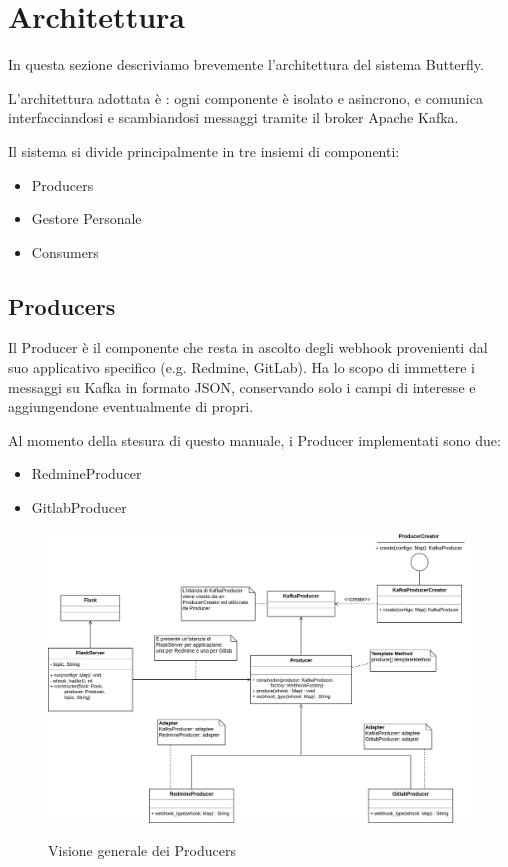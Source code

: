 \section{Architettura}

In questa sezione descriviamo brevemente l'architettura del sistema Butterfly.

L'architettura adottata è : ogni componente è isolato e asincrono,
e comunica interfacciandosi e scambiandosi messaggi tramite il broker Apache Kafka.

Il sistema si divide principalmente in tre insiemi di componenti:

\begin{itemize}
    \item Producers
    \item Gestore Personale
    \item Consumers
\end{itemize}

\subsection{Producers}
Il Producer è il componente che resta in ascolto degli webhook provenienti dal suo applicativo specifico (e.g. Redmine, GitLab).
Ha lo scopo di immettere i messaggi su Kafka in formato JSON, conservando solo i campi di interesse e aggiungendone eventualmente di propri.

Al momento della stesura di questo manuale, i Producer implementati sono due:
\begin{itemize}
    \item RedmineProducer
    \item GitlabProducer
\end{itemize}

\begin{figure}[H]
    \centering
    \includegraphics[width=\textwidth]{img/Producers.png}\\
    \caption{Visione generale dei Producers}
    \label{fig:producers}
\end{figure}

